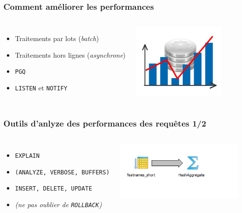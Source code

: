 \documentclass{beamer}
\begin{document}
\begin{frame}
  \frametitle{Comment améliorer les performances}

  \vfill

\begin{columns}[c]

\begin{itemize}
  \item Traitements par lots (\textit{batch})
  \item Traitements hors lignes (\textit{asynchrone})
  \item \texttt{PGQ}
  \item \texttt{LISTEN} et \texttt{NOTIFY}
\end{itemize}

\begin{center}
  \includegraphics[height=10em]{optimisation.jpg}
\end{center}
\end{columns}
\end{frame}

\begin{frame}
  \frametitle{Outils d'anlyze des performances des requêtes 1/2}

  \vfill

\begin{columns}[c]

\begin{itemize}
  \item \texttt{EXPLAIN}
  \item \texttt{(ANALYZE, VERBOSE, BUFFERS)}
  \item \texttt{INSERT, DELETE, UPDATE}
  \item \textit{(ne pas oublier de \texttt{ROLLBACK})}
\end{itemize}

\begin{center}
  \includegraphics[height=8em]{pg91_btree_explain_like2.png}
\end{center}
\end{columns}
\end{frame}
\end{document}
